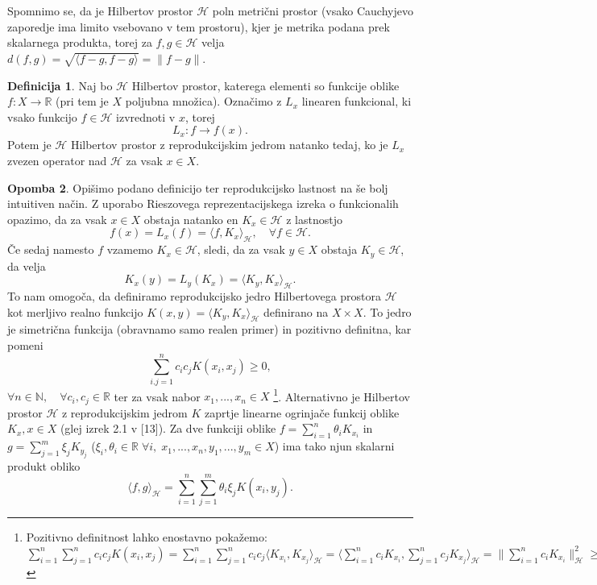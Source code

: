 \documentclass[12pt,a4paper]{amsart}
\theoremstyle{definition} %
\newtheorem{definicija}{Definicija}[section]
\newtheorem{opomba}[definicija]{Opomba}
\theoremstyle{plain} %
\begin{document}
Spomnimo se, da je Hilbertov prostor $\mathcal{H}$ poln metrični prostor (vsako Cauchyjevo zaporedje ima limito vsebovano v tem prostoru), kjer je metrika podana prek skalarnega produkta, torej za $f,g \in \mathcal{H}$ velja $d(f,g) = \sqrt{\langle f-g,f-g\rangle} = \|f -g\|$.
\begin{definicija}
Naj bo $\mathcal{H}$ Hilbertov prostor, katerega elementi so funkcije oblike $f: X \rightarrow \mathbb{R}$ (pri tem je $X$ poljubna množica). Označimo z $L_x$ linearen funkcional, ki vsako funkcijo $f \in \mathcal{H}$ izvrednoti v $x$, torej $$L_x : f \rightarrow f(x).$$ Potem je $\mathcal{H}$ Hilbertov prostor z reprodukcijskim jedrom natanko tedaj, ko je $L_x$ zvezen operator nad $\mathcal{H}$ za vsak $x \in X$. 
\end{definicija}
\begin{opomba}
Opišimo podano definicijo ter reprodukcijsko lastnost na še bolj intuitiven način. Z uporabo Rieszovega reprezentacijskega izreka o funkcionalih opazimo, da za vsak $x \in X$ obstaja natanko en $K_x \in \mathcal{H}$ z lastnostjo
$$
f(x) = L_x(f) = \langle f, K_x \rangle_{\mathcal{H}}, \quad \forall f \in \mathcal{H}.
$$
Če sedaj namesto $f$ vzamemo $K_x \in \mathcal{H}$, sledi, da za vsak $y \in X$ obstaja $K_y \in \mathcal{H}$, da velja
$$
K_x(y) = L_y(K_x) = \langle K_y, K_x \rangle_{\mathcal{H}}.
$$
To nam omogoča, da definiramo reprodukcijsko jedro Hilbertovega prostora $\mathcal{H}$ kot merljivo realno funkcijo $K(x,y)=\langle K_y, K_x \rangle_{\mathcal{H}}$ definirano na $X\times X$. To jedro je simetrična funkcija (obravnamo samo realen primer) in pozitivno definitna, kar pomeni $$\sum_{i.j=1}^n c_i c_j K(x_i, x_j) \geq 0,$$
 $\forall n \in \mathbb{N}, \quad \forall c_i, c_j \in \mathbb{R}$ ter za vsak nabor $x_1,...,x_n \in X$ \footnote{Pozitivno definitnost lahko enostavno pokažemo: $\sum_{i=1}^n \sum_{j=1}^n c_i c_j K(x_i, x_j) = \sum_{i=1}^n \sum_{j=1}^n c_i c_j \langle K_{x_i}, K_{x_j} \rangle_{\mathcal{H}} = \big\langle \sum_{i=1}^n c_i K_{x_i}, \sum_{j=1}^n c_j K_{x_j} \big\rangle_{\mathcal{H}} = \big\|\sum_{i=1}^n c_i K_{x_i}\big\|_{\mathcal{H}}^2 \geq 0$}.
\newline
\newline
Alternativno je Hilbertov prostor $\mathcal{H}$ z reprodukcijskim jedrom $K$ zaprtje linearne ogrinjače funkcij oblike $K_x, x \in X$ (glej izrek 2.1 v [13]). Za dve funkciji oblike $f = \sum_{i=1}^{n}\theta_i K_{x_i}$ in $ g = \sum_{j=1}^{m}\xi_j K_{y_j}$ ($\xi_i, \theta_i \in \mathbb{R} \; \forall i, \; x_1,...,x_n,y_1,...,y_m \in X$) ima tako njun skalarni produkt obliko
$$
\langle f, g\rangle_{\mathcal{H}} = \sum_{i=1}^{n}\sum_{j=1}^{m}\theta_i \xi_j K(x_i,y_j).
$$
\end{opomba}
\end{document}

